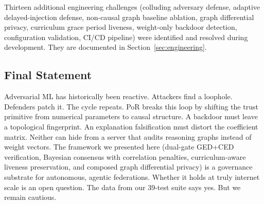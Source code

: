 \documentclass[journal]{IEEEtran}
\begin{document}
Thirteen additional engineering challenges (colluding adversary defense, adaptive delayed-injection defense, non-causal graph baseline ablation, graph differential privacy, curriculum grace period liveness, weight-only backdoor detection, configuration validation, CI/CD pipeline) were identified and resolved during development. They are documented in Section~\ref{sec:engineering}.

\subsection*{Final Statement}

Adversarial ML has historically been reactive. Attackers find a loophole. Defenders patch it. The cycle repeats. PoR breaks this loop by shifting the trust primitive from numerical parameters to causal structure. A backdoor must leave a topological fingerprint. An explanation falsification must distort the coefficient matrix. Neither can hide from a server that audits reasoning graphs instead of weight vectors. The framework we presented here (dual-gate GED+CED verification, Bayesian consensus with correlation penalties, curriculum-aware liveness preservation, and composed graph differential privacy) is a governance substrate for autonomous, agentic federations. Whether it holds at truly internet scale is an open question. The data from our 39-test suite says yes. But we remain cautious.
\end{document}
